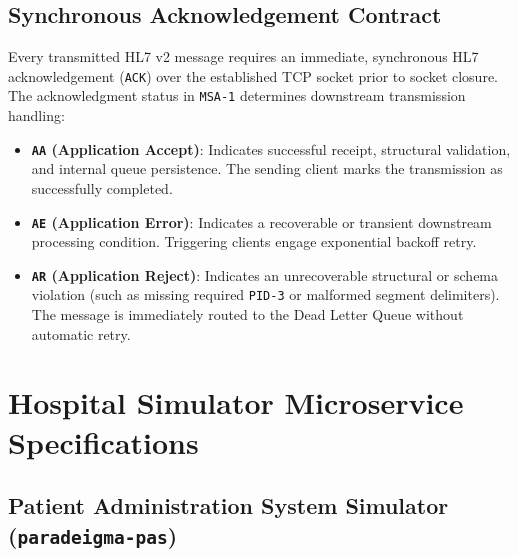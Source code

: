 \subsection{Synchronous Acknowledgement Contract}

Every transmitted HL7 v2 message requires an immediate, synchronous HL7 acknowledgement (\texttt{ACK}) over the established TCP socket prior to socket closure. The acknowledgment status in \texttt{MSA-1} determines downstream transmission handling:
\begin{itemize}
    \item \textbf{\texttt{AA} (Application Accept)}: Indicates successful receipt, structural validation, and internal queue persistence. The sending client marks the transmission as successfully completed.
    \item \textbf{\texttt{AE} (Application Error)}: Indicates a recoverable or transient downstream processing condition. Triggering clients engage exponential backoff retry.
    \item \textbf{\texttt{AR} (Application Reject)}: Indicates an unrecoverable structural or schema violation (such as missing required \texttt{PID-3} or malformed segment delimiters). The message is immediately routed to the Dead Letter Queue without automatic retry.
\end{itemize}

\section{Hospital Simulator Microservice Specifications}
\label{sec:paradeigma_simulators}

\subsection{Patient Administration System Simulator (\texttt{paradeigma-pas})}

